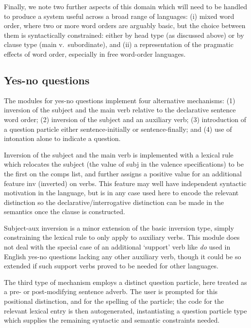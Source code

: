 Finally, we note two further aspects of this domain which will need
to be handled to produce a system useful across a broad range of
languages: (i) mixed word order, where two or more word
orders are arguably basic, but the choice between them is syntactically
constrained: either by head type (as discussed above) or by clause
type (main v.\ subordinate), and (ii) a representation of the
pragmatic effects of word order, especially in free word-order
languages.


\subsection{Yes-no questions}

The modules for yes-no questions implement four alternative mechanisms:
(1) inversion of the subject and the main verb relative to the declarative
sentence word order; (2) inversion of the subject and an auxiliary
verb; (3) introduction of a question particle either sentence-initially or
sentence-finally; and (4) use of intonation alone to indicate a question.

Inversion of the subject and the main verb is implemented with a lexical
rule which relocates the subject (the value of {\sc subj} in the valence
specifications) to be the first on the {\sc comps} list, and further
assigns a positive value for an additional feature {\sc inv} (inverted)
on verbs.  This feature may well have independent syntactic motivation in 
the language, but is in any case used here to encode the relevant distinction
so the declarative/interrogative distinction can be made in the semantics
once the clause is constructed.

Subject-aux inversion is a minor extension of the basic inversion type,
simply constraining the lexical rule to only apply to auxiliary verbs.
This module does not deal with the special case of an additional `support'
verb like {\it do} used in English yes-no questions lacking any other
auxiliary verb, though it could be so extended if such support verbs
proved to be needed for other languages.

The third type of mechanism employs a distinct question particle, here
treated as a pre- or post-modifying sentence adverb.  The user is
prompted for this positional distinction, and for the spelling of the
particle; the code for the relevant lexical entry is then
autogenerated, instantiating a question particle type which supplies
the remaining syntactic and semantic constraints needed.

